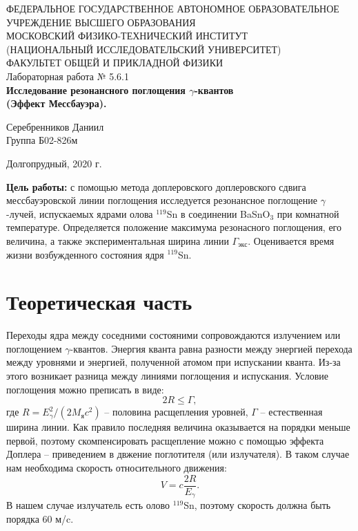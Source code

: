 \documentclass[a4paper,12pt]{article} %
\begin{document}
\begin{center}
	\footnotesize{ФЕДЕРАЛЬНОЕ ГОСУДАРСТВЕННОЕ АВТОНОМНОЕ ОБРАЗОВАТЕЛЬНОЕ 			УЧРЕЖДЕНИЕ ВЫСШЕГО ОБРАЗОВАНИЯ}\\
	\footnotesize{МОСКОВСКИЙ ФИЗИКО-ТЕХНИЧЕСКИЙ ИНСТИТУТ\\(НАЦИОНАЛЬНЫЙ 			ИССЛЕДОВАТЕЛЬСКИЙ УНИВЕРСИТЕТ)}\\
	\footnotesize{ФАКУЛЬТЕТ ОБЩЕЙ И ПРИКЛАДНОЙ ФИЗИКИ\\}
	\hfill \break
	\hfill\break
	\hfill\break
	\hfill \break
	\hfill \break
	\hfill \break
	\hfill \break
	\hfill \break
	\hfill \break
	\hfill \break
	\hfill \break
	\hfill \break
	\hfill \break
	\hfill \break
	\large{Лабораторная работа № 5.6.1 \\\textbf{Исследование резонансного поглощения $\gamma$-квантов\\ (Эффект Мессбауэра).}}\\
	\hfill \break
	\hfill \break
	\hfill \break
	\begin{flushright}
		Серебренников Даниил\\
		Группа Б02-826м
	\end{flushright}
	\hfill \break
	\hfill \break
	\hfill \break
	\hfill \break
	\hfill \break
	\hfill \break
	\hfill \break
	\hfill \break
	\hfill \break
	\hfill \break
	\hfill \break
\end{center}
\begin{center}
	Долгопрудный, 2020 г.
\end{center}
\thispagestyle{empty}
\newpage
	\textbf{Цель работы:} с помощью метода доплеровского доплеровского сдвига мессбауэровской линии поглощения исследуется резонансное поглощение $\gamma$-лучей, испускаемых ядрами олова $^{119}$Sn в соединении BaSnO$_3$ при комнатной температуре. Определяется положение максимума резонасного поглощения, его величина, а также экспериментальная ширина линии $\Gamma_{экс}$. Оценивается время жизни возбужденного состояния ядря $^{119}$Sn.

\section{Теоретическая часть}
	Переходы ядра между соседними состояними сопровождаются излучением или поглощением $\gamma$-квантов. Энергия кванта равна разности между энергией перехода между уровнями и энергией, полученной атомом при испускании кванта. Из-за этого возникает разница между линиями поглощения и испускания. Условие поглощения можно преписать в виде:
	\begin{equation}
		2R\leq \Gamma,
	\end{equation}  
	где $R = E_\gamma^2/(2M_\text{я}c^2)$ -- половина расщепления уровней, $\Gamma$ -- естественная ширина линии. Как правило последняя величина оказывается на порядки меньше первой, поэтому скомпенсировать расщепление можно с помощью эффекта Доплера -- приведением в двжение поглотителя (или излучателя). В таком случае нам необходима скорость относительного движения:
	\begin{equation}
		V = c \frac{2R}{E_\gamma}.
	\end{equation}
	В нашем случае излучатель есть олово $^{119}$Sn, поэтому скорость должна быть порядка 60 м/c.
	
\end{document}
